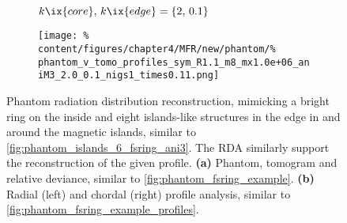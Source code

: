             \begin{figure}%
                \centering%
                \begin{subfigure}{\textwidth}%
                    \centering%
                    \caption{$k\ix{core},\,k\ix{edge}=\left\{2,\,0.1\right\}$}%
                \end{subfigure}%
                \newline%
                \begin{subfigure}{\textwidth}%
                    \centering%
                    \texttt{[image: \%
                        content/figures/chapter4/MFR/new/phantom/\%
                        phantom\_v\_tomo\_profiles\_sym\_R1.1\_m8\_mx1.0e+06\_aniM3\_2.0\_0.1\_nigs1\_times0.11.png]}%
                    \caption{}%
                \end{subfigure}%
                \caption{Phantom radiation distribution reconstruction, mimicking a bright ring on the inside and eight islands-like structures in the edge in and around the magnetic islands, similar to \cref{fig:phantom_islands_6_fsring_ani3}. The RDA similarly support the reconstruction of the given profile. \textbf{(a)} Phantom, tomogram and relative deviance, similar to \cref{fig:phantom_fsring_example}. \textbf{(b)} Radial (left) and chordal (right) profile analysis, similar to \cref{fig:phantom_fsring_example_profiles}.}\label{fig:phantom_islands_8}%
            \end{figure}%
%
